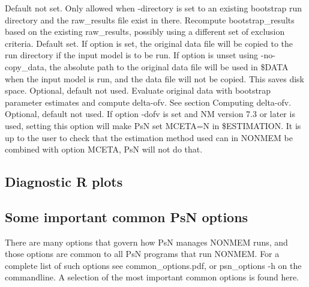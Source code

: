 \begin{optionlist}
\nextopt
{}
Default not set. Only allowed when -directory is set to an existing bootstrap run directory and
the raw\_results file exist in there. Recompute bootstrap\_results based on the existing raw\_results,
possibly using a different set of exclusion criteria.
\nextopt
{}
Default set. If option is set, the original data file
will be copied to the run directory if the input model is to be run.
If option is unset using -no-copy\_data, the absolute path to the original data file will be used in
\$DATA when the input model is run, and the data file will not be copied. This saves disk space.
\nextopt
{}
Optional, default not used. Evaluate original data with bootstrap parameter estimates and compute delta-ofv. See section Computing delta-ofv. 
\nextopt
{}
Optional, default not used. If option -dofv is set and NM version 7.3 or later is used, setting this option will make PsN set MCETA=N in \$ESTIMATION. It is up to the user to check that the estimation method used can in NONMEM be combined with option MCETA, PsN will not do that. 
\nextopt
\end{optionlist}

\subsection{Diagnostic R plots}
\newcommand{\rplotsconditions}{
See section Output, subsections Basic and Extended plots,
for descriptions of the default bootstrap plots.
The default bootstrap template 
requires the xpose4 R library of at least version 4.5.0,
and that R libraries ggplot2, plyr, dplyr are installed.
If the conditions are not fulfilled then no pdf will be generated,
see the .Rout file in the main run directory for error messages.
}


\subsection{Some important common PsN options}
There are many options that govern how PsN manages NONMEM runs, and
those options are common to all PsN programs that run NONMEM.
For a complete list of such options see common\_options.pdf, 
or psn\_options -h on the commandline. A selection of
the most important common options is found here.



